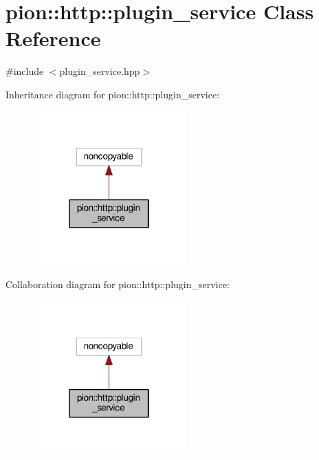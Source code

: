 \hypertarget{classpion_1_1http_1_1plugin__service}{\section{pion\-:\-:http\-:\-:plugin\-\_\-service Class Reference}
\label{classpion_1_1http_1_1plugin__service}
}


{\ttfamily \#include $<$plugin\-\_\-service.\-hpp$>$}



Inheritance diagram for pion\-:\-:http\-:\-:plugin\-\_\-service\-:
\nopagebreak
\begin{figure}[H]
\begin{center}
\leavevmode
\includegraphics[width=166pt]{classpion_1_1http_1_1plugin__service__inherit__graph}
\end{center}
\end{figure}


Collaboration diagram for pion\-:\-:http\-:\-:plugin\-\_\-service\-:
\nopagebreak
\begin{figure}[H]
\begin{center}
\leavevmode
\includegraphics[width=166pt]{classpion_1_1http_1_1plugin__service__coll__graph}
\end{center}
\end{figure}
